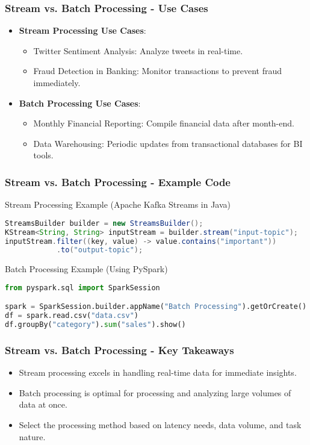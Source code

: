 \documentclass[aspectratio=169]{beamer}
\begin{document}
\begin{frame}[fragile]
    \frametitle{Stream vs. Batch Processing - Use Cases}
    \begin{itemize}
        \item \textbf{Stream Processing Use Cases}:
        \begin{itemize}
            \item Twitter Sentiment Analysis: Analyze tweets in real-time.
            \item Fraud Detection in Banking: Monitor transactions to prevent fraud immediately.
        \end{itemize}
        \item \textbf{Batch Processing Use Cases}:
        \begin{itemize}
            \item Monthly Financial Reporting: Compile financial data after month-end.
            \item Data Warehousing: Periodic updates from transactional databases for BI tools.
        \end{itemize}
    \end{itemize}
\end{frame}

\begin{frame}[fragile]
    \frametitle{Stream vs. Batch Processing - Example Code}
    \begin{block}{Stream Processing Example (Apache Kafka Streams in Java)}
    \begin{lstlisting}[language=Java]
StreamsBuilder builder = new StreamsBuilder();
KStream<String, String> inputStream = builder.stream("input-topic");
inputStream.filter((key, value) -> value.contains("important"))
            .to("output-topic");
    \end{lstlisting}
    \end{block}
    
    \begin{block}{Batch Processing Example (Using PySpark)}
    \begin{lstlisting}[language=Python]
from pyspark.sql import SparkSession

spark = SparkSession.builder.appName("Batch Processing").getOrCreate()
df = spark.read.csv("data.csv")
df.groupBy("category").sum("sales").show()
    \end{lstlisting}
    \end{block}
\end{frame}

\begin{frame}[fragile]
    \frametitle{Stream vs. Batch Processing - Key Takeaways}
    \begin{itemize}
        \item Stream processing excels in handling real-time data for immediate insights.
        \item Batch processing is optimal for processing and analyzing large volumes of data at once.
        \item Select the processing method based on latency needs, data volume, and task nature.
    \end{itemize}
\end{frame}
\end{document}
